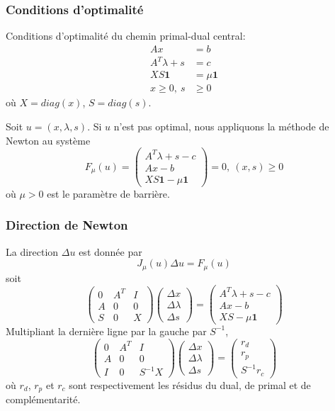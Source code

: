 \documentclass[usepdftitle=false, aspectratio=169]{beamer}
\def\bone{\boldsymbol{1}}
\begin{document}
\begin{frame}
\frametitle{Conditions d'optimalité}

Conditions d'optimalité du chemin primal-dual central:
\begin{align*}
Ax &= b \\
A^T\lambda + s &= c \\
XS\bone &= \mu\bone \\
x \geq 0,\ s & \geq 0
\end{align*}
où $X = diag(x)$, $S= diag(s)$.

\mbox{}

Soit $u = (x,\lambda, s)$. Si $u$ n'est pas optimal, nous appliquons la méthode de Newton au système
$$
F_{\mu}(u) = \begin{pmatrix}
	A^T\lambda+s-c  \\
	Ax-b  \\
	XS\bone - \mu\bone 
\end{pmatrix} = 0, \ (x,s) \geq 0
$$
où $\mu > 0$ est le paramètre de barrière.

\end{frame}

\begin{frame}
\frametitle{Direction de Newton}

La direction $\Delta u$ est donnée par
$$
J_{\mu}(u)\Delta u = F_{\mu}(u)
$$
soit
$$
\begin{pmatrix}
	0 & A^T & I  \\
	A & 0 & 0\\
	S & 0 & X
\end{pmatrix}
\begin{pmatrix}
	\Delta x  \\
	\Delta \lambda \\
	\Delta s
\end{pmatrix} = \begin{pmatrix}
	A^T\lambda+s-c  \\
	Ax-b  \\
	XS-\mu \bone
\end{pmatrix}$$
Multipliant la dernière ligne par la gauche par $S^{-1}$,
$$
\begin{pmatrix}
	0 & A^T & I  \\
	A & 0 & 0\\
	I & 0 & S^{-1}X
\end{pmatrix}
\begin{pmatrix}
	\Delta x  \\
	\Delta \lambda \\
	\Delta s
\end{pmatrix} = \begin{pmatrix}
	r_d  \\
	r_p  \\
	S^{-1}r_c 
\end{pmatrix}$$
où $r_d$, $r_p$ et $r_c$ sont respectivement les résidus du dual, de primal et de complémentarité.

\end{frame}
\end{document}
